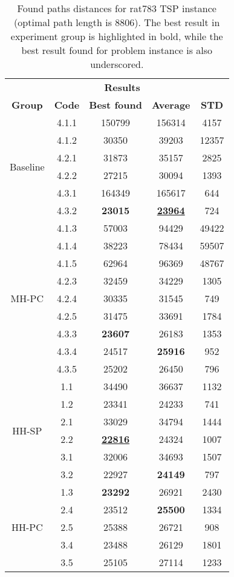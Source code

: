\begin{table}[!htbp]
	\begin{tabular}{cc|ccc}
		\hline
		\rowcolor{gray!20}
		\multicolumn{2}{c|}{\textbf{Solver}} & \multicolumn{3}{c}{\textbf{Results}} \\
		\rowcolor{gray!20}
		\textbf{Group} & \textbf{Code} & \textbf{Best found} & \textbf{Average} & \textbf{STD} \\
		\hline
		\multirow{6}{*}{Baseline} 
		& 4.1.1 & 150799 & 156314 & 4157 \\
		& 4.1.2 & 30350 & 39203 & 12357 \\
		& 4.2.1 & 31873 & 35157 & 2825 \\
		& 4.2.2 & 27215 & 30094 & 1393 \\
		& 4.3.1 & 164349 & 165617 & 644 \\
		& 4.3.2 & \textbf{23015} & \textbf{\underline{23964}} & 724 \\
		\hline
		\multirow{9}{*}{MH-PC} 
		& 4.1.3 & 57003 & 94429 & 49422 \\
		& 4.1.4 & 38223 & 78434 & 59507 \\
		& 4.1.5 & 62964 & 96369 & 48767 \\
		& 4.2.3 & 32459 & 34229 & 1305 \\
		& 4.2.4 & 30335 & 31545 & 749 \\
		& 4.2.5 & 31475 & 33691 & 1784 \\
		& 4.3.3 & \textbf{23607} & 26183 & 1353 \\
		& 4.3.4 & 24517 & \textbf{25916} & 952 \\
		& 4.3.5 & 25202 & 26450 & 796 \\
		\hline
		\multirow{6}{*}{HH-SP} 
		& 1.1 & 34490 & 36637 & 1132 \\
		& 1.2 & 23341 & 24233 & 741 \\
		& 2.1 & 33029 & 34794 & 1444 \\
		& 2.2 & \textbf{\underline{22816}} & 24324 & 1007 \\
		& 3.1 & 32006 & 34693 & 1507 \\
		& 3.2 & 22927 & \textbf{24149} & 797 \\
		\hline
		\multirow{5}{*}{HH-PC} 
		& 1.3 & \textbf{23292} & 26921 & 2430 \\
		& 2.4 & 23512 & \textbf{25500} & 1334 \\
		& 2.5 & 25388 & 26721 & 908 \\
		& 3.4 & 23488 & 26129 & 1801 \\
		& 3.5 & 25105 & 27114 & 1233 \\
		\hline
	\end{tabular}
	\caption{Found paths distances for rat783 TSP instance (optimal path length is 8806). The best result in experiment group is highlighted in bold, while the best result found for problem instance is also underscored.}
\end{table}

